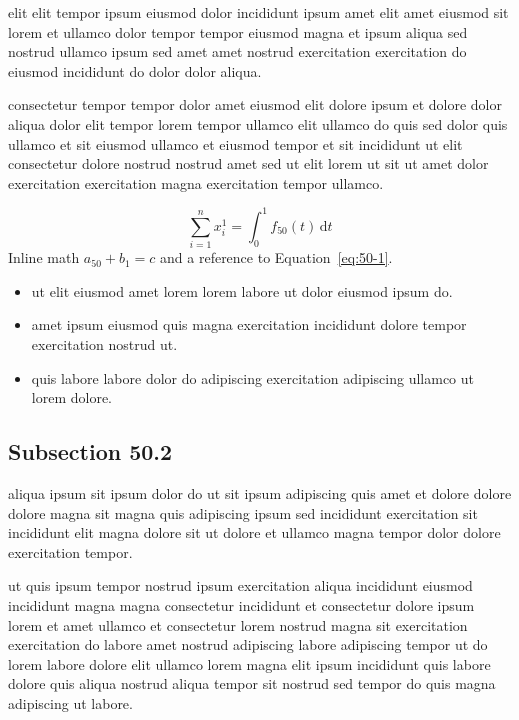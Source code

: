 \documentclass{article}
\begin{document}
elit elit tempor ipsum eiusmod dolor incididunt ipsum amet elit amet eiusmod sit lorem et ullamco dolor tempor tempor eiusmod magna et ipsum aliqua sed nostrud ullamco ipsum sed amet amet nostrud exercitation exercitation do eiusmod incididunt do dolor dolor aliqua.

consectetur tempor tempor dolor amet eiusmod elit dolore ipsum et dolore dolor aliqua dolor elit tempor lorem tempor ullamco elit ullamco do quis sed dolor quis ullamco et sit eiusmod ullamco et eiusmod tempor et sit incididunt ut elit consectetur dolore nostrud nostrud amet sed ut elit lorem ut sit ut amet dolor exercitation exercitation magna exercitation tempor ullamco.

\begin{equation}\label{eq:50-1}
  \sum_{i=1}^{n} x_i^{1} = \int_0^1 f_{50}(t)\,\mathrm{d}t
\end{equation}
Inline math $a_{50} + b_{1} = c$ and a reference to Equation~\eqref{eq:50-1}.

\begin{itemize}
  \item ut elit eiusmod amet lorem lorem labore ut dolor eiusmod ipsum do.
  \item amet ipsum eiusmod quis magna exercitation incididunt dolore tempor exercitation nostrud ut.
  \item quis labore labore dolor do adipiscing exercitation adipiscing ullamco ut lorem dolore.
\end{itemize}

\subsection{Subsection 50.2}\label{sec:50-2}
aliqua ipsum sit ipsum dolor do ut sit ipsum adipiscing quis amet et dolore dolore dolore magna sit magna quis adipiscing ipsum sed incididunt exercitation sit incididunt elit magna dolore sit ut dolore et ullamco magna tempor dolor dolore exercitation tempor.

ut quis ipsum tempor nostrud ipsum exercitation aliqua incididunt eiusmod incididunt magna magna consectetur incididunt et consectetur dolore ipsum lorem et amet ullamco et consectetur lorem nostrud magna sit exercitation exercitation do labore amet nostrud adipiscing labore adipiscing tempor ut do lorem labore dolore elit ullamco lorem magna elit ipsum incididunt quis labore dolore quis aliqua nostrud aliqua tempor sit nostrud sed tempor do quis magna adipiscing ut labore.
\end{document}
